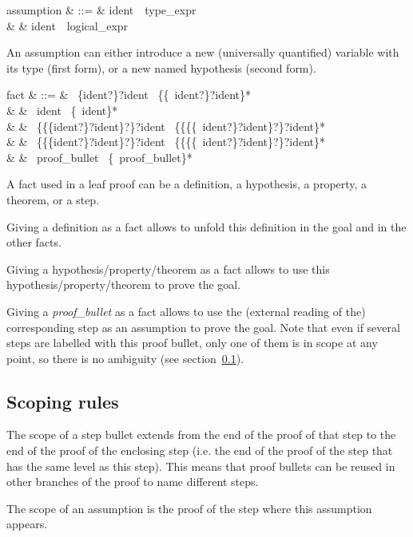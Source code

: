 \begin{syntax}
assumption & ::= & ident\ \ type\_expr \\
           & \mid & ident\ \terminal{:}\ logical\_expr
\end{syntax}

An assumption can either introduce a new (universally quantified)
variable with its type (first form), or a new named hypothesis (second
form).

\begin{syntax}
fact & ::= & 
                     \ \{ident?\terminal{\#}\}?ident
     \ \{\{\terminal{,}\ ident?\terminal{\#}\}?ident\}*
\\
     & \mid & 
                     \ ident
     \ \{\terminal{,}\ ident\}*
\\
     & \mid & 
          \ \{\{\{ident?\terminal{\#}\}?ident\}?\terminal{!}\}?ident
\ \{\{\{\{\terminal{,}\ ident?\terminal{\#}\}?ident\}?\terminal{!}\}?ident\}*
\\
     & \mid & 
          \ \{\{\{ident?\terminal{\#}\}?ident\}?\terminal{!}\}?ident
\ \{\{\{\{\terminal{,}\ ident?\terminal{\#}\}?ident\}?\terminal{!}\}?ident\}*
\\
     & \mid & 
                 \ proof\_bullet
  \ \{\terminal{,}\ proof\_bullet\}*
\end{syntax}

A fact used in a leaf proof can be a definition, a hypothesis, a
property, a theorem, or a step.

Giving a definition as a fact allows \zenon{} to unfold this
definition in the goal and in the other facts.

Giving a hypothesis/property/theorem as a fact allows \zenon{} to use
this hypothesis/property/theorem to prove the goal.

Giving a {\em proof\_bullet} as a fact allows \zenon{} to use the
(external reading of the) corresponding step as an assumption to prove
the goal.  Note that even if several steps are labelled with this
proof bullet, only one of them is in scope at any point, so there is
no ambiguity (see section~\ref{sec:scoping}).

\subsection{Scoping rules}\label{sec:scoping}

The scope of a step bullet extends from the end of the proof of that
step to the end of the proof of the enclosing step (i.e. the end of
the proof of the  step that has the same level as this
step).  This means that proof bullets can be reused in other branches
of the proof to name different steps.

The scope of an assumption is the proof of the step where this
assumption appears.
